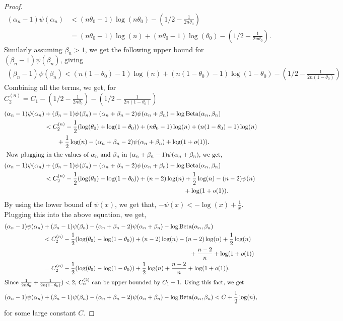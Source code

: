\documentclass[11pt]{amsart}
\begin{document}
\begin{proof}
\begin{align*}
     (\alpha_n-1)\psi(\alpha_n) & < (n\theta_0-1)\log(n\theta_0)-\left(1/2-\frac{1}{2n\theta_0}\right)\\
     & = (n\theta_0-1)\log(n)+(n\theta_0-1)\log(\theta_0) -\left(1/2-\frac{1}{2n\theta_0}\right).
\end{align*}
Similarly assuming $\beta_n>1$, we get the following upper bound for $(\beta_n-1)\psi(\beta_n)$, giving
\begin{align*}
    (\beta_n-1)\psi(\beta_n) < (n(1-\theta_0)-1)\log(n)+(n(1-\theta_0)-1)\log(1-\theta_0)-\left(1/2-\frac{1}{2n(1-\theta_0)}\right)
\end{align*}
Combining all the terms, we get, for $C^{(n)}_2=C_1-(1/2-\frac{1}{2n\theta_0})-(1/2-\frac{1}{2n(1-\theta_0)})$
\begin{align*}
    (\alpha_n-1)\psi(\alpha_n) & +(\beta_n-1)\psi(  \beta_n)-(\alpha_n+\beta_n-2)\psi(\alpha_n+\beta_n)-\log \text{Beta}(\alpha_n,\beta_n)  \\
    & < C^{(n)}_2 - \frac{1}{2}(\log(\theta_0)+\log(1-\theta_0))+(n\theta_0-1)\log(n)+(n(1-\theta_0)-1)\log(n)\\
    & \qquad +\frac{1}{2}\log (n)-(\alpha_n+\beta_n-2)\psi(\alpha_n+\beta_n)+\log(1+o(1)).\\
    \intertext{ Now plugging in the values of $\alpha_n$ and $\beta_n$ in $(\alpha_n+\beta_n-1)\psi(\alpha_n+\beta_n)$, we get,}
    (\alpha_n-1)\psi(\alpha_n) & +(\beta_n-1)\psi(  \beta_n)-(\alpha_n+\beta_n-2)\psi(\alpha_n+\beta_n)-\log \text{Beta}(\alpha_n,\beta_n)  \\
    & < C^{(n)}_2-\frac{1}{2}(\log(\theta_0)-\log(1-\theta_0))+(n-2)\log(n)+\frac{1}{2}\log (n)-(n-2)\psi(n)\\&\qquad\qquad\qquad\qquad\qquad\qquad\qquad\qquad\qquad\qquad\qquad +\log(1+o(1)).
\end{align*}
By using the lower bound of $\psi(x)$, we get that, $-\psi(x)<-\log(x)+\frac{1}{x}$. Plugging this into the above equation, we get,
\begin{align*}
    (\alpha_n-1)\psi(\alpha_n) & +(\beta_n-1)\psi(  \beta_n)-(\alpha_n+\beta_n-2)\psi(\alpha_n+\beta_n)-\log \text{Beta}(\alpha_n,\beta_n)  \\
     & < C^{(n)}_2-\frac{1}{2}(\log(\theta_0)-\log(1-\theta_0))+(n-2)\log(n) - (n-2)\log(n)+\frac{1}{2}\log(n)\\ &\qquad\qquad\qquad\qquad\qquad\qquad\qquad\qquad\qquad\qquad\qquad\qquad +\frac{n-2}{n} +\log(1+o(1))\\
     & = C^{(n)}_2-\frac{1}{2}(\log(\theta_0)-\log(1-\theta_0))+\frac{1}{2}\log(n)+\frac{n-2}{n}+\log(1+o(1)).\\
     \intertext{Since $\frac{1}{2n\theta_0}+\frac{1}{2n(1-\theta_0)})<2$, $C^{(2)}_n$ can be upper bounded by $C_1+1$. Using this fact, we get}
    (\alpha_n-1)\psi(\alpha_n) & +(\beta_n-1)\psi(  \beta_n)-(\alpha_n+\beta_n-2)\psi(\alpha_n+\beta_n)-\log \text{Beta}(\alpha_n,\beta_n) < C+\frac{1}{2}\log(n),
\end{align*}
for some large constant $C$.
\end{proof}
\end{document}

